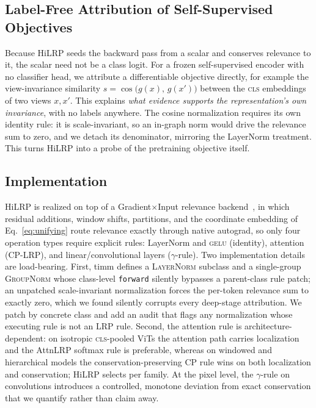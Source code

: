 \documentclass[lettersize,journal]{IEEEtran}
\begin{document}
\subsection{Label-Free Attribution of Self-Supervised Objectives}
\label{sec:ssl}
Because HiLRP seeds the backward pass from a scalar and conserves relevance to it, the scalar need not be a class logit. For a frozen self-supervised encoder with no classifier head, we attribute a differentiable objective directly, for example the view-invariance similarity $s=\cos\!\big(g(x),\,g(x')\big)$ between the \textsc{cls} embeddings of two views $x,x'$. This explains \emph{what evidence supports the representation's own invariance}, with no labels anywhere. The cosine normalization requires its own identity rule: it is scale-invariant, so an in-graph norm would drive the relevance sum to zero, and we detach its denominator, mirroring the LayerNorm treatment. This turns HiLRP into a probe of the pretraining objective itself.

\subsection{Implementation}
\label{sec:implementation}
HiLRP is realized on top of a Gradient$\times$Input relevance backend~\cite{achtibat2024attnlrp}, in which residual additions, window shifts, partitions, and the coordinate embedding of Eq.~\eqref{eq:unifying} route relevance exactly through native autograd, so only four operation types require explicit rules: LayerNorm and \textsc{gelu} (identity), attention (CP-LRP), and linear/convolutional layers ($\gamma$-rule). Two implementation details are load-bearing. First, timm defines a \textsc{LayerNorm} subclass and a single-group \textsc{GroupNorm} whose class-level \texttt{forward} silently bypasses a parent-class rule patch; an unpatched scale-invariant normalization forces the per-token relevance sum to exactly zero, which we found silently corrupts every deep-stage attribution. We patch by concrete class and add an audit that flags any normalization whose executing rule is not an LRP rule. Second, the attention rule is architecture-dependent: on isotropic \textsc{cls}-pooled ViTs the attention path carries localization and the AttnLRP softmax rule is preferable, whereas on windowed and hierarchical models the conservation-preserving CP rule wins on both localization and conservation; HiLRP selects per family. At the pixel level, the $\gamma$-rule on convolutions introduces a controlled, monotone deviation from exact conservation that we quantify rather than claim away.
\end{document}
